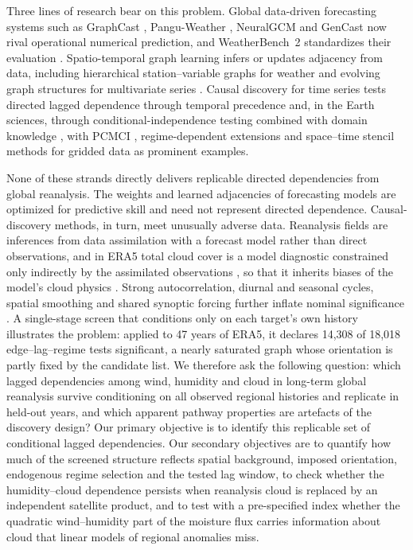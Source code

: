 \documentclass[preprint,12pt]{elsarticle}
\begin{document}
Three lines of research bear on this problem. Global data-driven forecasting systems such as GraphCast \citep{Lam2023GraphCast}, Pangu-Weather \citep{Bi2023Pangu}, NeuralGCM \citep{Kochkov2024NeuralGCM} and GenCast \citep{Price2025GenCast} now rival operational numerical prediction, and WeatherBench~2 standardizes their evaluation \citep{Rasp2024WeatherBench2}. Spatio-temporal graph learning infers or updates adjacency from data, including hierarchical station--variable graphs for weather \citep{Ma2023HiSTGNN} and evolving graph structures for multivariate series \citep{Ye2025EvolvingGraph}. Causal discovery for time series tests directed lagged dependence through temporal precedence \citep{Shojaie2022Granger} and, in the Earth sciences, through conditional-independence testing combined with domain knowledge \citep{Runge2023TimeSeries}, with PCMCI \citep{Runge2019PCMCI}, regime-dependent extensions \citep{Saggioro2020RegimePCMCI} and space--time stencil methods for gridded data \citep{Nichol2025CaStLe} as prominent examples.

None of these strands directly delivers replicable directed dependencies from global reanalysis. The weights and learned adjacencies of forecasting models are optimized for predictive skill and need not represent directed dependence. Causal-discovery methods, in turn, meet unusually adverse data. Reanalysis fields are inferences from data assimilation with a forecast model rather than direct observations, and in ERA5 total cloud cover is a model diagnostic constrained only indirectly by the assimilated observations \citep{Soci2024ERA5}, so that it inherits biases of the model's cloud physics \citep{Hellmuth2025CloudPhase}. Strong autocorrelation, diurnal and seasonal cycles, spatial smoothing and shared synoptic forcing further inflate nominal significance \citep{Runge2023TimeSeries}. A single-stage screen that conditions only on each target's own history illustrates the problem: applied to 47 years of ERA5, it declares 14,308 of 18,018 edge--lag--regime tests significant, a nearly saturated graph whose orientation is partly fixed by the candidate list. We therefore ask the following question: which lagged dependencies among wind, humidity and cloud in long-term global reanalysis survive conditioning on all observed regional histories and replicate in held-out years, and which apparent pathway properties are artefacts of the discovery design? Our primary objective is to identify this replicable set of conditional lagged dependencies. Our secondary objectives are to quantify how much of the screened structure reflects spatial background, imposed orientation, endogenous regime selection and the tested lag window, to check whether the humidity--cloud dependence persists when reanalysis cloud is replaced by an independent satellite product, and to test with a pre-specified index whether the quadratic wind--humidity part of the moisture flux carries information about cloud that linear models of regional anomalies miss.
\end{document}
